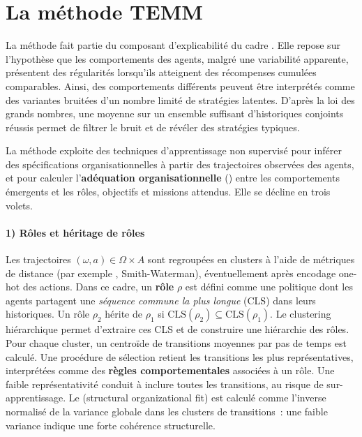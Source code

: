 
\section{La méthode TEMM}
\label{sec:TEMM_algorithm}

La méthode  fait partie du composant d'explicabilité du cadre . Elle repose sur l’hypothèse que les comportements des agents, malgré une variabilité apparente, présentent des régularités lorsqu'ils atteignent des récompenses cumulées comparables. Ainsi, des comportements différents peuvent être interprétés comme des variantes bruitées d'un nombre limité de stratégies latentes. D’après la loi des grands nombres, une moyenne sur un ensemble suffisant d’historiques conjoints réussis permet de filtrer le bruit et de révéler des stratégies typiques.

La méthode exploite des techniques d’apprentissage non supervisé pour inférer des spécifications organisationnelles à partir des trajectoires observées des agents, et pour calculer l’\textbf{adéquation organisationnelle} () entre les comportements émergents et les rôles, objectifs et missions attendus. Elle se décline en trois volets.

\paragraph{1) Rôles et héritage de rôles}
Les trajectoires $(\omega, a) \in \Omega \times A$ sont regroupées en clusters à l’aide de métriques de distance (par exemple , Smith-Waterman), éventuellement après encodage one-hot des actions.
Dans ce cadre, un \textbf{rôle} $\rho$ est défini comme une politique dont les agents partagent une \textit{séquence commune la plus longue} (CLS) dans leurs historiques.
Un rôle $\rho_2$ hérite de $\rho_1$ si $\text{CLS}(\rho_2) \subseteq \text{CLS}(\rho_1)$.
Le clustering hiérarchique permet d’extraire ces CLS et de construire une hiérarchie des rôles.
Pour chaque cluster, un centroïde de transitions moyennes par pas de temps est calculé. Une procédure de sélection retient les transitions les plus représentatives, interprétées comme des \textbf{règles comportementales} associées à un rôle.
Une faible représentativité conduit à inclure toutes les transitions, au risque de sur-apprentissage.
Le \textbf{} (structural organizational fit) est calculé comme l’inverse normalisé de la variance globale dans les clusters de transitions~: une faible variance indique une forte cohérence structurelle.

